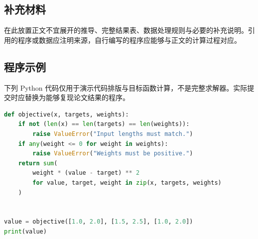 \documentclass{gmcmthesis}
\begin{document}



\appendix

\subsection{补充材料}
在此放置正文不宜展开的推导、完整结果表、数据处理规则与必要的补充说明。引用的程序或数据应注明来源，自行编写的程序应能够与正文的计算过程对应。

\subsection{程序示例}
下列 Python 代码仅用于演示代码排版与目标函数计算，不是完整求解器。实际提交时应替换为能够复现论文结果的程序。

\begin{lstlisting}[language=Python]
def objective(x, targets, weights):
    if not (len(x) == len(targets) == len(weights)):
        raise ValueError("Input lengths must match.")
    if any(weight <= 0 for weight in weights):
        raise ValueError("Weights must be positive.")
    return sum(
        weight * (value - target) ** 2
        for value, target, weight in zip(x, targets, weights)
    )


value = objective([1.0, 2.0], [1.5, 2.5], [1.0, 2.0])
print(value)
\end{lstlisting}
\end{document}
